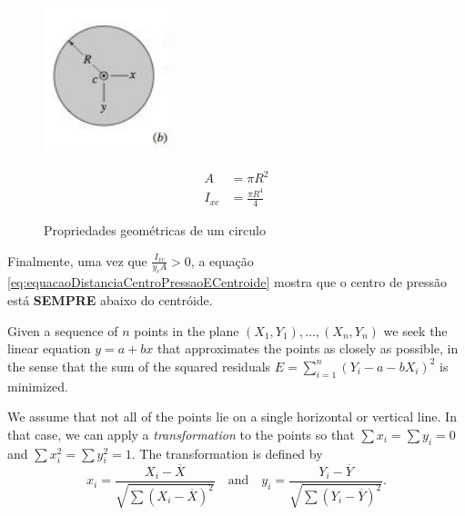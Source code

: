 \documentclass{article}
\begin{document}
\begin{figure}[!h]
  \centering
  \begin{minipage}{0.45\textwidth}
    \centering
    \includegraphics[width=0.7\linewidth]{propriedadesGeometricaCirculo.png}
    \caption{Propriedades geométricas de um circulo}
  \end{minipage}\hfill
  \begin{minipage}{0.45\textwidth}
    \centering
    \begin{align*}
      A&=\pi R^2\\
      I_{xc}&=\frac{\pi R^4}{4}
    \end{align*}
  \end{minipage}
\end{figure}
Finalmente, uma vez que $\frac{I_{xc}}{y_cA}>0$, a equação \ref{eq:equacaoDistanciaCentroPressaoECentroide} mostra que o centro de pressão está \textbf{SEMPRE} abaixo do centróide. 

\iffalse
Given a sequence of $n$ points in the plane $(X_1, Y_1), \ldots, (X_n, Y_n)$
we seek the linear equation $y = a + bx$ that approximates the points
as closely as possible, in the sense that the sum of the squared residuals
$E = \sum_{i=1}^n (Y_i - a - bX_i)^2$ is minimized.

We assume that not all of the points lie on a single horizontal or vertical
line. In that case, we can apply a \emph{transformation} to the points
so that $\sum x_i = \sum y_i = 0$ and $\sum x_i^2 = \sum y_i^2 = 1$.
The transformation is defined by
$$
x_i = \frac{X_i - \overline{X}}{\sqrt{\sum (X_i - \overline{X})^2}}\quad\text{and}\quad
y_i = \frac{Y_i - \overline{Y}}{\sqrt{\sum (Y_i - \overline{Y})^2}}.
$$
\end{document}
